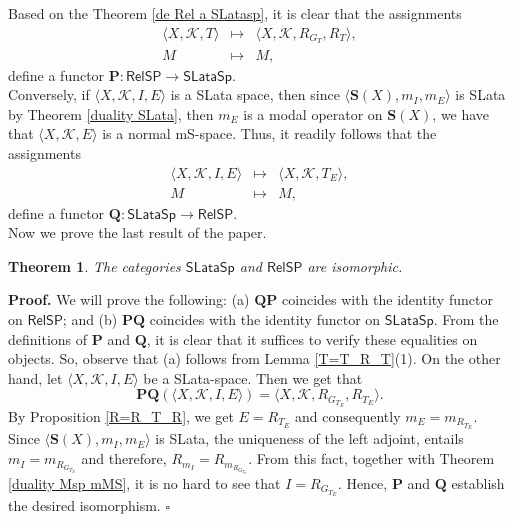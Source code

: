 \documentclass{article}
\newtheorem{theorem}{\bf Theorem}[section]
\newenvironment{proof}
{\par\noindent\textbf{Proof. }\rm}
{\hfill$\boldsymbol{\square}$\par\vspace{0.3cm}}
\begin{document}
Based on the Theorem \ref{de Rel a SLatasp}, it is clear that the assignments
\[
\begin{array}{rcl}
   \langle X, \mathcal{K}, T\rangle & \mapsto & \langle X, \mathcal{K}, R_{G_T}, R_T\rangle, \\
   M & \mapsto & M, 
\end{array}
\]
define a functor \(\mathbf{P} : \mathsf{RelSP} \to \mathsf{SLataSp}\).
\\

Conversely, if $\langle X, \mathcal{K}, I,E\rangle$ is a SLata space, then since  $\langle \mathbf{S}(X),m_{I}, m_{E}\rangle$ is SLata by Theorem \ref{duality SLata}, then $m_{E}$ is a modal operator on $\mathbf{S}(X)$, we have that $\langle X, \mathcal{K}, E\rangle$ is a normal mS-space. Thus, it readily follows that the assignments
\[
\begin{array}{rcl}
    \langle X, \mathcal{K}, I,E\rangle  & \mapsto & \langle X, \mathcal{K},
T_E\rangle, \\
     M & \mapsto & M, 
\end{array}
\]
define a functor $\mathbf{Q}:\mathsf{SLataSp} \rightarrow \mathsf{RelSP}$.
\\

Now we prove the last result of the paper.

\begin{theorem}\label{last theorem}
    The categories $\mathsf{SLataSp}$ and $\mathsf{RelSP}$ are isomorphic.
\end{theorem}
\begin{proof}
We will prove the following: (a) $\mathbf{Q}\mathbf{P}$ coincides with the identity functor on $\mathsf{RelSP}$; and (b) $\mathbf{P}\mathbf{Q}$ coincides with the identity functor on $\mathsf{SLataSp}$. From the definitions of $\mathbf{P}$ and $\mathbf{Q}$, it is clear that it suffices to verify these equalities on objects. So, observe that (a) follows from Lemma \ref{T=T_R_T}(1). On the other hand, let $\langle X, \mathcal{K}, I,E\rangle$ be a SLata-space. Then we get that 
\[\mathbf{P}\mathbf{Q}(\langle X, \mathcal{K}, I,E\rangle)=\langle X, \mathcal{K}, R_{G_{T_E}},R_{T_E}\rangle.\]
By Proposition \ref{R=R_T_R}, we get $E=R_{T_E}$ and consequently $m_{E}=m_{R_{T_E}}$. Since $\langle \mathbf{S}(X),m_{I}, m_{E}\rangle$ is SLata, the uniqueness of the left adjoint, entails $m_I=m_{R_{G_{T_E}}}$ and therefore, $R_{m_I}=R_{m_{R_{G_{T_E}}}}$. From this fact, together with Theorem \ref{duality Msp mMS}, it is no hard to see that $I=R_{G_{T_E}}$. Hence, $\mathbf{P}$ and $\mathbf{Q}$ establish the desired isomorphism.
\end{proof}
\end{document}
